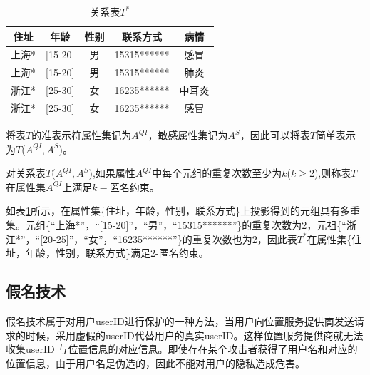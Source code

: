 \begin{table}[hbp]
\label{k-anony-2}
\centering  %
\begin{tabular}{ccccc}  %
\hline
住址 &年龄&性别 &联系方式&病情\\ \hline  %
上海*&[15-20]&男 &15315****** &感冒\\         %
上海*&[15-20]&男 &15315****** &肺炎\\        %
浙江*&[25-30]&女 &16235****** &中耳炎\\
浙江*&[25-30]&女 &16235****** &感冒\\ \hline
\end{tabular}
\caption{关系表$T^*$}
\end{table}

将表$T$的准表示符属性集记为$A^{QI}$，敏感属性集记为$A^S$，因此可以将表$T$简单表示为$T$($A^{QI},A^S$)。

\begin{define}[k-匿名约束]
对关系表$T$($A^{QI},A^S$),如果属性$A^{QI}$中每个元组的重复次数至少为$k$($k\geq$2),则称表$T$在属性集$A^{QI}$上满足$k-$匿名约束。
\end{define}

如表\ref{k-anony-2}所示，在属性集\{住址，年龄，性别，联系方式\}上投影得到的元组具有多重集。元组\{“上海*”，“[15-20]”，“男”，“15315******”\}的重复次数为2，元祖\{“浙江*”，“[20-25]”，“女”，“16235******”\}的重复次数也为2，因此表$T^*$在属性集\{住址，年龄，性别，联系方式\}满足2-匿名约束。
\subsection{假名技术}
假名技术属于对用户userID进行保护的一种方法，当用户向位置服务提供商发送请求的时候，采用虚假的userID代替用户的真实userID。这样位置服务提供商就无法收集userID 与位置信息的对应信息。即使存在某个攻击者获得了用户名和对应的位置信息，由于用户名是伪造的，因此不能对用户的隐私造成危害。

